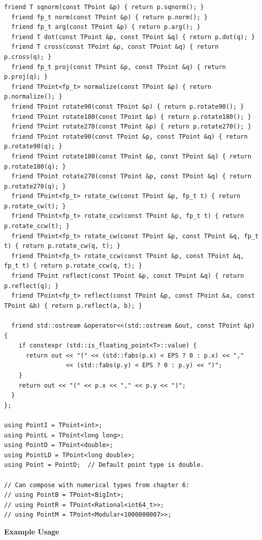 \begin{lstlisting}[style=cpp]
  friend T sqnorm(const TPoint &p) { return p.sqnorm(); }
  friend fp_t norm(const TPoint &p) { return p.norm(); }
  friend fp_t arg(const TPoint &p) { return p.arg(); }
  friend T dot(const TPoint &p, const TPoint &q) { return p.dot(q); }
  friend T cross(const TPoint &p, const TPoint &q) { return p.cross(q); }
  friend fp_t proj(const TPoint &p, const TPoint &q) { return p.proj(q); }
  friend TPoint<fp_t> normalize(const TPoint &p) { return p.normalize(); }
  friend TPoint rotate90(const TPoint &p) { return p.rotate90(); }
  friend TPoint rotate180(const TPoint &p) { return p.rotate180(); }
  friend TPoint rotate270(const TPoint &p) { return p.rotate270(); }
  friend TPoint rotate90(const TPoint &p, const TPoint &q) { return p.rotate90(q); }
  friend TPoint rotate180(const TPoint &p, const TPoint &q) { return p.rotate180(q); }
  friend TPoint rotate270(const TPoint &p, const TPoint &q) { return p.rotate270(q); }
  friend TPoint<fp_t> rotate_cw(const TPoint &p, fp_t t) { return p.rotate_cw(t); }
  friend TPoint<fp_t> rotate_ccw(const TPoint &p, fp_t t) { return p.rotate_ccw(t); }
  friend TPoint<fp_t> rotate_cw(const TPoint &p, const TPoint &q, fp_t t) { return p.rotate_cw(q, t); }
  friend TPoint<fp_t> rotate_ccw(const TPoint &p, const TPoint &q, fp_t t) { return p.rotate_ccw(q, t); }
  friend TPoint reflect(const TPoint &p, const TPoint &q) { return p.reflect(q); }
  friend TPoint<fp_t> reflect(const TPoint &p, const TPoint &a, const TPoint &b) { return p.reflect(a, b); }

  friend std::ostream &operator<<(std::ostream &out, const TPoint &p) {
    if constexpr (std::is_floating_point<T>::value) {
      return out << "(" << (std::fabs(p.x) < EPS ? 0 : p.x) << ","
                 << (std::fabs(p.y) < EPS ? 0 : p.y) << ")";
    }
    return out << "(" << p.x << "," << p.y << ")";
  }
};

using PointI = TPoint<int>;
using PointL = TPoint<long long>;
using PointD = TPoint<double>;
using PointLD = TPoint<long double>;
using Point = PointD;  // Default point type is double.

// Can compose with numerical types from chapter 6:
// using PointB = TPoint<BigInt>;
// using PointR = TPoint<Rational<int64_t>>;
// using PointM = TPoint<Modular<1000000007>>;
\end{lstlisting}
\textbf{Example Usage}\par
